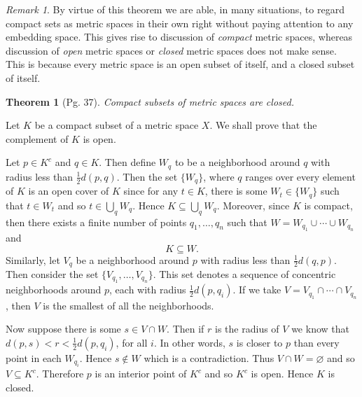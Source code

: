\documentclass[leqno]{article}
\makeatletter
\newtheorem{theorem}{Theorem}[section]
\theoremstyle{definition}
\theoremstyle{remark}
\newtheorem*{remark}{Remark}
\let\oldproofname=\proofname
\renewcommand{\proofname}{\bf{\textit{\oldproofname}}}
\renewenvironment{proof}[1][\proofname]{\par
  \pushQED{\qed}%
  \normalfont \topsep6\p@\@plus6\p@\relax
  \list{}{\leftmargin=0mm
          \rightmargin=0mm
          \settowidth{\itemindent}{\itshape#1}%
          \labelwidth=4mm
          \parsep=0pt \listparindent=0mm%
  }
  \item[\hskip\labelsep
        \itshape
    #1\@addpunct{.}]\ignorespaces
}{%
  \popQED\endlist\@endpefalse
}
\makeatother
\begin{document}
            \begin{remark}
                By virtue of this theorem we are able, in many situations, to regard compact sets as metric spaces in their own right without paying attention to any embedding space. This gives rise to discussion of \emph{compact} metric spaces, whereas discussion of \emph{open} metric spaces or \emph{closed} metric spaces does not make sense. This is because every metric space is an open subset of itself, and a closed subset of itself.
            \end{remark}
            \begin{theorem}[Pg. 37]\label{thm:6.2}
                Compact subsets of metric spaces are closed. 
            \end{theorem}
                \begin{proof}
                    Let $K$ be a compact subset of a metric space $X$. We shall prove that the complement of $K$ is open.\par\hspace{4mm} Let $p\in K^c$ and $q\in K$. Then define $W_q$ to be a neighborhood around $q$ with radius less than $\frac{1}{2}d(p,q)$. Then the set $\{W_q\}$, where $q$ ranges over every element of $K$ is an open cover of $K$ since for any $t\in K$, there is some $W_t\in\{W_q\}$ such that $t\in W_t$ and so $t\in\bigcup_qW_q$. Hence $K\subseteq\bigcup_qW_q$. Moreover, since $K$ is compact, then there exists a finite number of points $q_1,\dots,q_n$ such that $W=W_{q_1}\cup\cdots\cup W_{q_n}$ and
                        \begin{equation*}
                            K\subseteq W.
                        \end{equation*}
                    Similarly, let $V_q$ be a neighborhood around $p$ with radius less than $\frac{1}{2}d(q,p)$. Then consider the set $\{V_{q_1},\dots,V_{q_n}\}$. This set denotes a sequence of concentric neighborhoods around $p$, each with radius $\frac{1}{2}d(p,q_i)$. If we take $V=V_{q_1}\cap\cdots\cap V_{q_n}$, then $V$ is the smallest of all the neighborhoods.\par\hspace{4mm} Now suppose there is some $s\in V\cap W$. Then if $r$ is the radius of $V$ we know that $d(p,s)<r<\frac{1}{2}d(p,q_i)$, for all $i$. In other words, $s$ is closer to $p$ than every point in each $W_{q_i}$. Hence $s\notin W$ which is a contradiction. Thus $V\cap W=\varnothing$ and so $V\subseteq K^c$. Therefore $p$ is an interior point of $K^c$ and so $K^c$ is open. Hence $K$ is closed.  
                \end{proof}
\end{document}
